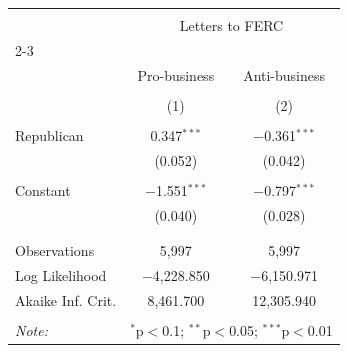 
\begin{tabular}{@{\extracolsep{5pt}}lcc} 
\\[-1.8ex]\hline 
\hline \\[-1.8ex] 
 & \multicolumn{2}{c}{Letters to FERC} \\ 
\cline{2-3} 
\\[-1.8ex] & Pro-business & Anti-business \\ 
\\[-1.8ex] & (1) & (2)\\ 
\hline \\[-1.8ex] 
 Republican & 0.347$^{***}$ & $-$0.361$^{***}$ \\ 
  & (0.052) & (0.042) \\ 
  & & \\ 
 Constant & $-$1.551$^{***}$ & $-$0.797$^{***}$ \\ 
  & (0.040) & (0.028) \\ 
  & & \\ 
\hline \\[-1.8ex] 
Observations & 5,997 & 5,997 \\ 
Log Likelihood & $-$4,228.850 & $-$6,150.971 \\ 
Akaike Inf. Crit. & 8,461.700 & 12,305.940 \\ 
\hline 
\hline \\[-1.8ex] 
\textit{Note:}  & \multicolumn{2}{r}{$^{*}$p$<$0.1; $^{**}$p$<$0.05; $^{***}$p$<$0.01} \\ 
\end{tabular} 

